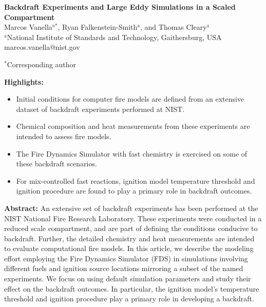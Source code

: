 \documentclass[12pt,letterpaper]{article}
\begin{document}
\begin{flushleft} %

\textbf{Backdraft Experiments and Large Eddy Simulations in a Scaled Compartment}
\vspace{3mm}\\
%
Marcos Vanella$^\text{a*}$, Ryan Falkenstein-Smith$^\text{a}$, and Thomas Cleary$^\text{a}$
\vspace{3mm}\\	

$^\text{a}$National Institute of Standards and Technology, Gaithersburg, USA  \\
marcos.vanella@nist.gov
\vspace{3mm}

$^*$Corresponding author

\textbf{Highlights:}	
\begin{itemize}
	\itemsep-4pt %
	\item Initial conditions for computer fire models are defined from an extensive dataset of backdraft experiments performed at NIST.
    \item Chemical composition and heat measurements from these experiments are intended to assess fire models.
	\item The Fire Dynamics Simulator with fast chemistry is exercised on some of these backdraft scenarios.
	\item For mix-controlled fast reactions, ignition model temperature threshold and ignition procedure are found to play a primary role in backdraft outcomes. 
\end{itemize}
\vspace{3mm}

\textbf{Abstract:}
An extensive set of backdraft experiments has been performed at the NIST National Fire Research Laboratory. These experiments were conducted in a reduced scale compartment, and are part of defining the conditions conducive to backdraft. Further, the detailed chemistry and heat measurements are intended to evaluate computational fire models. In this article, we describe the modeling effort employing the Fire Dynamics Simulator (FDS) in simulations involving different fuels and ignition source locations mirroring a subset of the named experiments. We focus on using default simulation parameters and study their effect on the backdraft outcomes. In particular, the ignition model's temperature threshold and ignition procedure play a primary role in developing a backdraft.


\end{flushleft}
\end{document}

